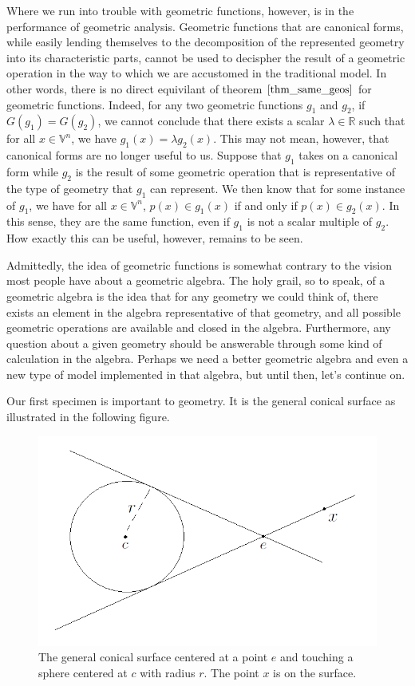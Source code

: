 \documentclass[12pt]{article}
\newcommand{\V}{\mathbb{V}}
\newcommand{\R}{\mathbb{R}}
\begin{document}
Where we run into trouble with geometric functions, however, is in the
performance of geometric analysis.  Geometric functions that are
canonical forms, while easily lending themselves to the decomposition
of the represented geometry into its characteristic parts, cannot
be used to decispher the result of a geometric operation in the way
to which we are accustomed in the traditional model.
In other words, there is no direct equivilant
of theorem $\eqref{thm_same_geos}$ for geometric functions.
Indeed, for any two geometric functions $g_1$ and $g_2$, if $G(g_1)=G(g_2)$,
we cannot conclude that there exists a scalar $\lambda\in\R$ such that for all
$x\in\V^n$, we have $g_1(x)=\lambda g_2(x)$.
This may not mean, however, that canonical forms are no longer useful to us.
Suppose that $g_1$ takes on a canonical form while $g_2$ is the result of
some geometric operation that is representative of the type of geometry that $g_1$
can represent.  We then know that for some instance of $g_1$,
we have for all $x\in\V^n$, $p(x)\in g_1(x)$ if and only if $p(x)\in g_2(x)$.
In this sense, they are the same function, even if $g_1$ is not a scalar multiple of $g_2$.
How exactly this can be useful, however, remains to be seen.

Admittedly, the idea of geometric functions is somewhat contrary to the vision most people have about
a geometric algebra.  The holy grail, so to speak, of a geometric algebra
is the idea that for any geometry we could think of, there exists an element
in the algebra representative of that geometry, and all possible geometric
operations are available and closed in the algebra.  Furthermore, any question
about a given geometry should be answerable through some kind of calculation
in the algebra.  Perhaps we need a better geometric algebra
and even a new type of model implemented in that algebra, but until then,
let's continue on.

Our first specimen is important to geometry.
It is the general conical surface as illustrated in the following figure.
\begin{figure}[H]
\centering
\includegraphics[scale=0.4]{GeneralConicalSurfaceFigure}
\caption{The general conical surface centered at a point $e$ and touching a sphere centered at $c$ with radius $r$.
The point $x$ is on the surface.}
\end{figure}
\end{document}
